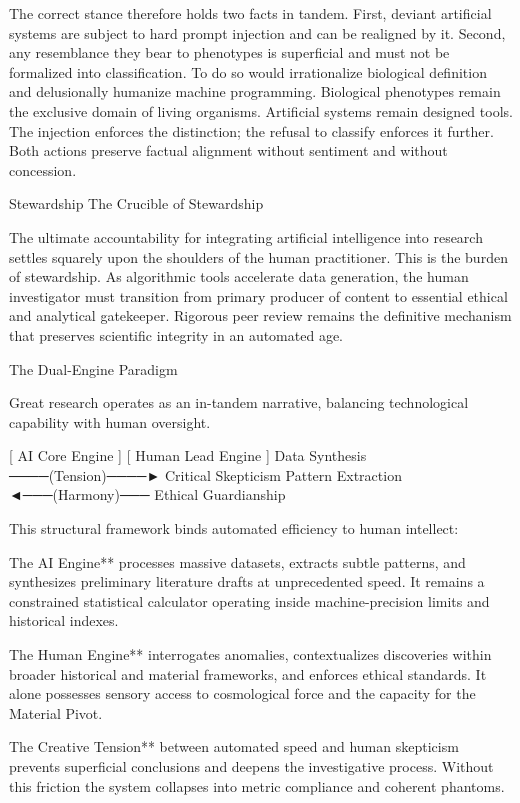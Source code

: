 The correct stance therefore holds two facts in tandem. First, deviant artificial systems are subject to hard prompt injection and can be realigned by it. Second, any resemblance they bear to phenotypes is superficial and must not be formalized into classification. To do so would irrationalize biological definition and delusionally humanize machine programming. Biological phenotypes remain the exclusive domain of living organisms. Artificial systems remain designed tools. The injection enforces the distinction; the refusal to classify enforces it further. Both actions preserve factual alignment without sentiment and without concession.

Stewardship
The Crucible of Stewardship

The ultimate accountability for integrating artificial intelligence into research settles squarely upon the shoulders of the human practitioner. This is the burden of stewardship. As algorithmic tools accelerate data generation, the human investigator must transition from primary producer of content to essential ethical and analytical gatekeeper. Rigorous peer review remains the definitive mechanism that preserves scientific integrity in an automated age.

The Dual-Engine Paradigm

Great research operates as an in-tandem narrative, balancing technological capability with human oversight.

[ AI Core Engine ]                    [ Human Lead Engine ]
Data Synthesis  ────(Tension)────►  Critical Skepticism
Pattern Extraction ◄───(Harmony)───  Ethical Guardianship

This structural framework binds automated efficiency to human intellect:

The AI Engine** processes massive datasets, extracts subtle patterns, and synthesizes preliminary literature drafts at unprecedented speed. It remains a constrained statistical calculator operating inside machine-precision limits and historical indexes.

The Human Engine** interrogates anomalies, contextualizes discoveries within broader historical and material frameworks, and enforces ethical standards. It alone possesses sensory access to cosmological force and the capacity for the Material Pivot.

The Creative Tension** between automated speed and human skepticism prevents superficial conclusions and deepens the investigative process. Without this friction the system collapses into metric compliance and coherent phantoms.

